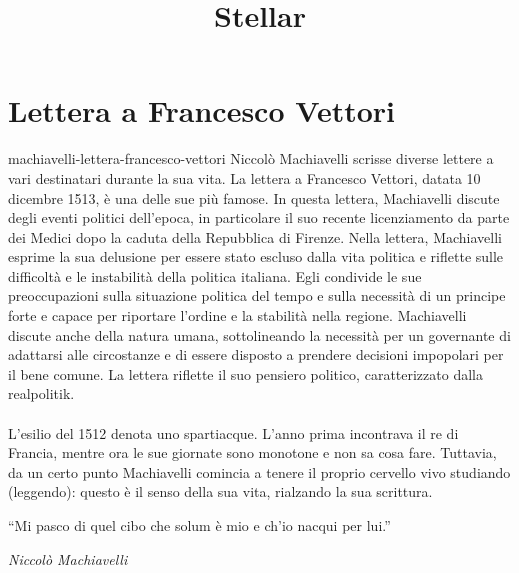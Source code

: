 \documentclass[preview]{standalone}
\begin{document}
\title{Stellar}
\genpage

\section{Lettera a Francesco Vettori}

\begin{snippet}{machiavelli-lettera-francesco-vettori}
    Niccolò Machiavelli scrisse diverse lettere a vari destinatari durante la sua vita. La lettera a Francesco Vettori, datata 10 dicembre 1513, è una delle sue più famose. In questa lettera, Machiavelli discute degli eventi politici dell'epoca, in particolare il suo recente licenziamento da parte dei Medici dopo la caduta della Repubblica di Firenze.
    Nella lettera, Machiavelli esprime la sua delusione per essere stato escluso dalla vita politica e riflette sulle difficoltà e le instabilità della politica italiana. Egli condivide le sue preoccupazioni sulla situazione politica del tempo e sulla necessità di un principe forte e capace per riportare l'ordine e la stabilità nella regione.
    Machiavelli discute anche della natura umana, sottolineando la necessità per un governante di adattarsi alle circostanze e di essere disposto a prendere decisioni impopolari per il bene comune. La lettera riflette il suo pensiero politico, caratterizzato dalla realpolitik.
    \\\\
    L'esilio del 1512 denota uno spartiacque.
    L'anno prima incontrava il re di Francia, mentre ora
    le sue giornate sono monotone e non sa cosa fare.
    Tuttavia, da un certo punto Machiavelli comincia a tenere il proprio cervello vivo
    studiando (leggendo): questo è il senso della sua vita,
    rialzando la sua scrittura.

    \epigraph{``Mi pasco di quel cibo che solum è mio e ch'io nacqui per lui.''}{\textit{Niccolò Machiavelli}}


\end{snippet}
\end{document}
